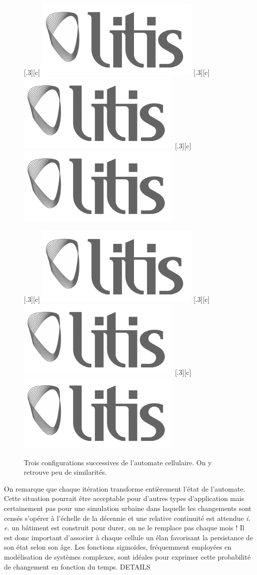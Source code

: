 \documentclass[12pt]{article}
\begin{document}
\begin{figure}[h]
  \centering
  \subcaptionbox{}[.3\linewidth][c]{
    \includegraphics[width=.3\linewidth]{images/logo-litis.png}
  }
  \subcaptionbox{}[.3\linewidth][c]{
    \includegraphics[width=.3\linewidth]{images/logo-litis.png}
  }
  \subcaptionbox{}[.3\linewidth][c]{
    \includegraphics[width=.3\linewidth]{images/logo-litis.png}
  }

  \subcaptionbox{}[.3\linewidth][c]{
    \includegraphics[width=.3\linewidth]{images/logo-litis.png}
  }
  \subcaptionbox{}[.3\linewidth][c]{
    \includegraphics[width=.3\linewidth]{images/logo-litis.png}
  }
  \subcaptionbox{}[.3\linewidth][c]{
    \includegraphics[width=.3\linewidth]{images/logo-litis.png}
  }
  \caption{Trois configurations successives de l'automate
    cellulaire. On y retrouve peu de similarités.}
  \label{fig:ac}
\end{figure}

On remarque que chaque itération transforme entièrement l'état de
l'automate. Cette situation pourrait être acceptable pour d'autres
types d'application mais certainement pas pour une simulation urbaine
dans laquelle les changements sont censés s'opérer à l'échelle de la
décennie et une relative continuité est attendue \textit{i. e.} un
bâtiment est construit pour durer, on ne le remplace pas chaque mois !
Il est donc important d'associer à chaque cellule un élan favorisant
la persistance de son état selon son âge. Les fonctions sigmoïdes,
fréquemment employées en modélisation de systèmes complexes, sont
idéales pour exprimer cette probabilité de changement en fonction du
temps. DETAILS
\end{document}

